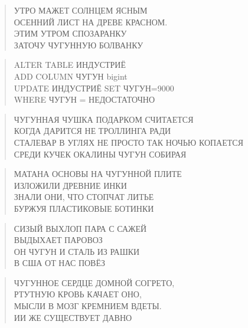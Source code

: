 \poemtitle{***}
\begin{verse}
УТРО МАЖЕТ СОЛНЦЕМ ЯСНЫМ\\
ОСЕННИЙ ЛИСТ НА ДРЕВЕ КРАСНОМ.\\
ЭТИМ УТРОМ СПОЗАРАНКУ\\
ЗАТОЧУ ЧУГУННУЮ БОЛВАНКУ
\end{verse}

\poemtitle{***}
\begin{verse}
ALTER TABLE ИНДУСТРИЁ\\
ADD COLUMN ЧУГУН bigint\\
UPDATE ИНДУСТРИЁ SET ЧУГУН=9000\\
WHERE ЧУГУН = НЕДОСТАТОЧНО
\end{verse}

\poemtitle{***}
\begin{verse}
ЧУГУННАЯ ЧУШКА ПОДАРКОМ СЧИТАЕТСЯ\\
КОГДА ДАРИТСЯ НЕ ТРОЛЛИНГА РАДИ\\
СТАЛЕВАР В УГЛЯХ НЕ ПРОСТО ТАК НОЧЬЮ КОПАЕТСЯ\\
СРЕДИ КУЧЕК ОКАЛИНЫ ЧУГУН СОБИРАЯ
\end{verse}

\poemtitle{***}
\begin{verse}
МАТАНА ОСНОВЫ НА ЧУГУННОЙ ПЛИТЕ\\
ИЗЛОЖИЛИ ДРЕВНИЕ ИНКИ\\
ЗНАЛИ ОНИ, ЧТО СТОПЧАТ ЛИТЬЕ\\
БУРЖУЯ ПЛАСТИКОВЫЕ БОТИНКИ
\end{verse}

\poemtitle{***}
\begin{verse}
СИЗЫЙ ВЫХЛОП ПАРА С САЖЕЙ\\
ВЫДЫХАЕТ ПАРОВОЗ\\
ОН ЧУГУН И СТАЛЬ ИЗ РАШКИ\\
В США ОТ НАС ПОВЁЗ
\end{verse}

\poemtitle{***}
\begin{verse}
ЧУГУННОЕ СЕРДЦЕ ДОМНОЙ СОГРЕТО,\\
РТУТНУЮ КРОВЬ КАЧАЕТ ОНО,\\
МЫСЛИ В МОЗГ КРЕМНИЕМ ВДЕТЫ.\\
ИИ ЖЕ СУЩЕСТВУЕТ ДАВНО
\end{verse}


